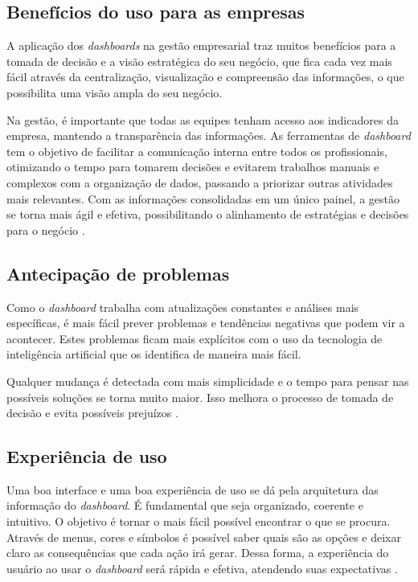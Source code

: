 \subsection{Benefícios do uso para as empresas}

\indent
\par A aplicação dos \textit{dashboards} na gestão empresarial traz muitos benefícios para a tomada de decisão e a visão estratégica do seu negócio, que fica cada vez mais fácil através da centralização,  visualização e compreensão das informações, o que possibilita uma visão ampla do seu negócio.

\par Na gestão, é importante que todas as equipes tenham acesso aos indicadores da empresa, mantendo a transparência das informações. As ferramentas de \textit{dashboard} tem o objetivo de facilitar a comunicação interna entre todos os profissionais, otimizando o tempo para tomarem decisões e evitarem trabalhos manuais e complexos com a organização de dados, passando a priorizar outras atividades mais relevantes. Com as informações consolidadas em um único painel, a gestão se torna mais ágil e efetiva, possibilitando o alinhamento de estratégias e decisões para o negócio \cite{Tecnicon}.

\subsection{Antecipação de problemas}

\indent
\par Como o \textit{dashboard} trabalha com atualizações constantes e análises mais específicas, é mais fácil prever problemas e tendências negativas que podem vir a acontecer. Estes problemas ficam mais explícitos com o uso da tecnologia de inteligência artificial que os identifica de maneira mais fácil.

\par Qualquer mudança é detectada com mais simplicidade e o tempo para pensar nas possíveis soluções se torna muito maior. Isso melhora o processo de tomada de decisão e evita possíveis prejuízos \cite{Systemsat}.

\subsection{Experiência de uso}

\indent
\par Uma boa interface e uma boa experiência de uso se dá pela arquitetura das informação do \textit{dashboard}. É fundamental que seja organizado, coerente e intuitivo. O objetivo é tornar o mais fácil possível encontrar o que se procura. Através de menus, cores e  símbolos é possível saber quais são as opções e deixar claro as consequências que cada ação irá gerar. Dessa forma, a experiência do usuário ao usar o \textit{dashboard} será rápida e efetiva, atendendo suas expectativas \cite{Hostinger}.

